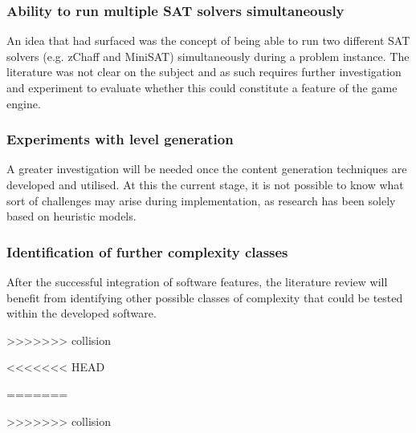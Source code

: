 \documentclass[11pt, a4paper, oneside]{report} %
\begin{document}
\subsubsection{Ability to run multiple SAT solvers simultaneously}

An idea that had surfaced was the concept of being able to run two different SAT
solvers (e.g. zChaff and MiniSAT) simultaneously during a problem instance. The
literature was not clear on the subject and as such requires further
investigation and experiment to evaluate whether this could constitute a feature
of the game engine.

\subsubsection{Experiments with level generation}

A greater investigation will be needed once the content generation techniques
are developed and utilised. At this the current stage, it is not possible to
know what sort of challenges may arise during implementation, as research has
been solely based on heuristic models.

\subsubsection{Identification of further complexity classes}

After the successful integration of software features, the literature review
will benefit from identifying other possible classes of complexity that could be
tested within the developed software.

>>>>>>> collision



<<<<<<< HEAD

=======

>>>>>>> collision
\end{document}
